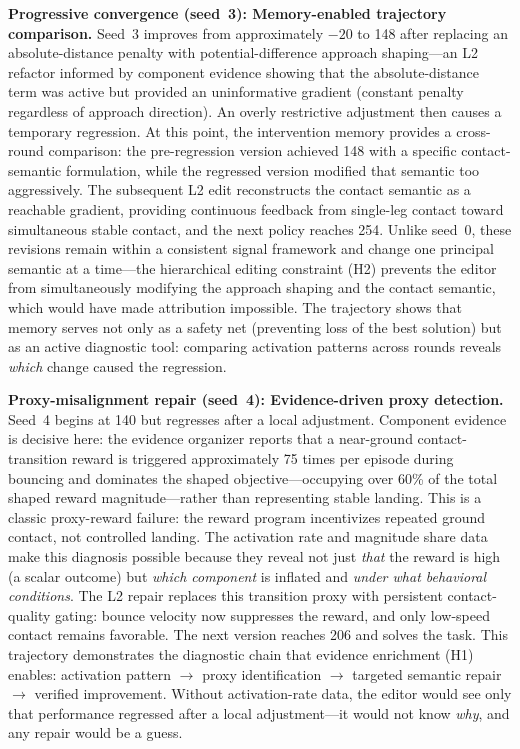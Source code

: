 \textbf{Progressive convergence (seed~3): Memory-enabled trajectory comparison.} Seed~3 improves from approximately $-20$ to 148 after replacing an absolute-distance penalty with potential-difference approach shaping---an L2 refactor informed by component evidence showing that the absolute-distance term was active but provided an uninformative gradient (constant penalty regardless of approach direction). An overly restrictive adjustment then causes a temporary regression. At this point, the intervention memory provides a cross-round comparison: the pre-regression version achieved 148 with a specific contact-semantic formulation, while the regressed version modified that semantic too aggressively. The subsequent L2 edit reconstructs the contact semantic as a reachable gradient, providing continuous feedback from single-leg contact toward simultaneous stable contact, and the next policy reaches 254. Unlike seed~0, these revisions remain within a consistent signal framework and change one principal semantic at a time---the hierarchical editing constraint (H2) prevents the editor from simultaneously modifying the approach shaping and the contact semantic, which would have made attribution impossible. The trajectory shows that memory serves not only as a safety net (preventing loss of the best solution) but as an active diagnostic tool: comparing activation patterns across rounds reveals \emph{which} change caused the regression.

\textbf{Proxy-misalignment repair (seed~4): Evidence-driven proxy detection.} Seed~4 begins at 140 but regresses after a local adjustment. Component evidence is decisive here: the evidence organizer reports that a near-ground contact-transition reward is triggered approximately 75 times per episode during bouncing and dominates the shaped objective---occupying over 60\% of the total shaped reward magnitude---rather than representing stable landing. This is a classic proxy-reward failure: the reward program incentivizes repeated ground contact, not controlled landing. The activation rate and magnitude share data make this diagnosis possible because they reveal not just \emph{that} the reward is high (a scalar outcome) but \emph{which component} is inflated and \emph{under what behavioral conditions}. The L2 repair replaces this transition proxy with persistent contact-quality gating: bounce velocity now suppresses the reward, and only low-speed contact remains favorable. The next version reaches 206 and solves the task. This trajectory demonstrates the diagnostic chain that evidence enrichment (H1) enables: activation pattern $\rightarrow$ proxy identification $\rightarrow$ targeted semantic repair $\rightarrow$ verified improvement. Without activation-rate data, the editor would see only that performance regressed after a local adjustment---it would not know \emph{why}, and any repair would be a guess.

